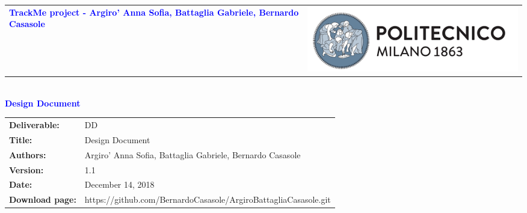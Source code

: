 




\begin{titlepage}


{\begin{table}[t!]
\centering
\begin{tabu} to \textwidth { X[1.3,r,p] X[1.7,l,p] }
\textcolor{Blue}{\textbf{\small{TrackMe project - Argiro' Anna Sofia, Battaglia Gabriele, Bernardo Casasole}}} & \includegraphics[scale=0.5]{images/PolimiLogo}
\end{tabu}
\end{table}}~\\ [7cm]


\centering
{\textcolor{Blue}{\textbf{\Huge{Design Document}}}} \\ [1cm]

\end{titlepage}

\begin{table}[h!]
\begin{tabu} to \textwidth { X[0.3,r,p] X[0.7,l,p] }
\hline

\textbf{Deliverable:} & DD\\
\textbf{Title:} & Design Document \\
\textbf{Authors:} & Argiro' Anna Sofia, Battaglia Gabriele, Bernardo Casasole \\
\textbf{Version:} & 1.1 \\
\textbf{Date:} & December 14, 2018 \\
\textbf{Download page:} & https://github.com/BernardoCasasole/ArgiroBattagliaCasasole.git \\
\hline
\end{tabu}
\end{table}

\setcounter{page}{2}

\newpage
{}
\tableofcontents


